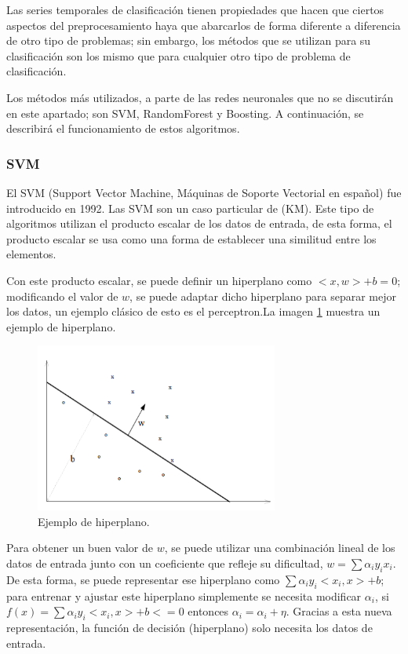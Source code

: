 Las series temporales de clasificación tienen propiedades que hacen que ciertos aspectos del preprocesamiento haya que abarcarlos de forma diferente a diferencia de otro tipo de problemas; sin embargo, los métodos que se utilizan para su clasificación son los mismo que para cualquier otro tipo de problema de clasificación.\newline

Los métodos más utilizados, a parte de las redes neuronales que no se discutirán en este apartado; son SVM, RandomForest y Boosting. A continuación, se describirá el funcionamiento de estos algoritmos.\newline

\subsubsection{SVM}
El SVM (Support Vector Machine, Máquinas de Soporte Vectorial en español) \cite{boser1992training} fue introducido en 1992. Las SVM son un caso particular de  (KM). Este tipo de algoritmos utilizan el producto escalar de los datos de entrada, de esta forma, el producto escalar se usa como una forma de establecer una similitud entre los elementos.\newline

Con este producto escalar, se puede definir un hiperplano como $<x,w> + b = 0$; modificando el valor de $w$, se puede adaptar dicho hiperplano para separar mejor los datos, un ejemplo clásico de esto es el perceptron.La imagen \ref{fig:214} muestra un ejemplo de hiperplano.\newline

\newpage
\begin{figure}[h]
	\centering
	\includegraphics[width=80mm]{imagenes/perceptron_example.png}
	\caption{Ejemplo de hiperplano.}
	\label{fig:214}
\end{figure}

Para obtener un buen valor de $w$, se puede utilizar una combinación lineal de los datos de entrada junto con un coeficiente que refleje su dificultad, $ w = \sum \alpha_i y_i x_i $. De esta forma, se puede representar ese hiperplano como $\sum \alpha_i y_i <x_i,x> + b$; para entrenar y ajustar este hiperplano simplemente se necesita modificar $\alpha_i$, si $f(x) = \sum \alpha_i y_i <x_i,x> + b <= 0$ entonces $\alpha_i = \alpha_i + \eta$. Gracias a esta nueva representación, la función de decisión (hiperplano) solo necesita los datos de entrada.\newline

